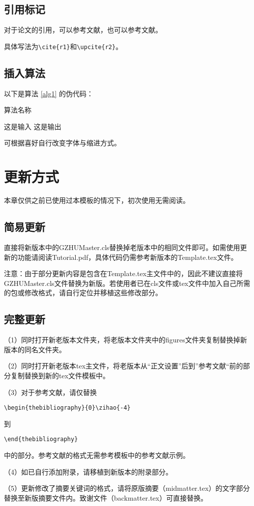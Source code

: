\documentclass{GZHUMaster}
\begin{document}
\section{引用标记}
对于论文的引用，可以参考文献\cite{r1}，也可以参考文献。\par
具体写法为\verb|\cite{r1}|和\verb|\upcite{r2}|。
\section{插入算法}
以下是算法 \ref{alg1} 的伪代码：\par
\begin{algorithm}[h]
  \caption{算法名称}
  \begin{algorithmic}[1] %
      \Require 这是输入
      \Ensure 这是输出
           
      \EndFor
      \EndIf
      \EndWhile
  \end{algorithmic}
  \label{alg1}
\end{algorithm}
可根据喜好自行改变字体与缩进方式。

\chapter{更新方式}
本章仅供之前已使用过本模板的情况下，初次使用无需阅读。
\section{简易更新}
直接将新版本中的GZHUMaster.cls替换掉老版本中的相同文件即可。如需使用更新的功能请阅读Tutorial.pdf，具体代码仍需参考新版本的Template.tex文件。\par
注意：由于部分更新内容是包含在Template.tex主文件中的，因此不建议直接将GZHUMaster.cls文件替换为新版。若使用者已在cls文件或tex文件中加入自己所需的包或修改格式，请自行定位并移植这些修改部分。
\section{完整更新}
（1）同时打开新老版本文件夹，将老版本文件夹中的figures文件夹复制替换掉新版本的同名文件夹。\par
（2）同时打开新老版本tex主文件，将老版本从“正文设置”后到”参考文献“前的部分复制替换到新的tex文件模板中。\par
（3）对于参考文献，请仅替换\par
\verb|\begin{thebibliography}{0}\zihao{-4}|\par
到\par
\verb|\end{thebibliography}|\par
中的部分。参考文献的格式无需参考模板中的参考文献示例。\par
（4）如已自行添加附录，请移植到新版本的附录部分。\par
（5）更新修改了摘要关键词的格式，请将原版摘要（midmatter.tex）的文字部分替换至新版摘要文件内。致谢文件（backmatter.tex）可直接替换。
\end{document}
